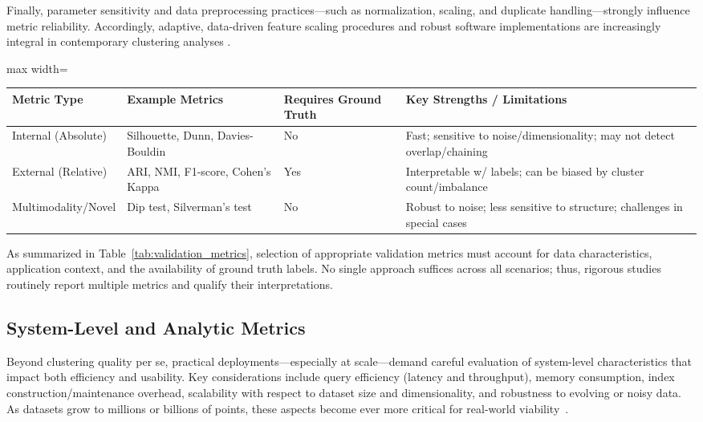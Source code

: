 \documentclass[sigconf]{acmart}
\begin{document}
Finally, parameter sensitivity and data preprocessing practices—such as normalization, scaling, and duplicate handling—strongly influence metric reliability. Accordingly, adaptive, data-driven feature scaling procedures and robust software implementations are increasingly integral in contemporary clustering analyses \cite{ref95,ref96}.

\begin{table*}[htbp]
\centering
\caption{Common Cluster Validation Metrics: Key Properties and Use Cases}
\label{tab:validation_metrics}
\begin{adjustbox}{max width=\textwidth}
\begin{tabular}{llll}
\toprule
\textbf{Metric Type} & \textbf{Example Metrics} & \textbf{Requires Ground Truth} & \textbf{Key Strengths / Limitations} \\
\midrule
Internal (Absolute)  & Silhouette, Dunn, Davies-Bouldin & No  & Fast; sensitive to noise/dimensionality; may not detect overlap/chaining \\
External (Relative)  & ARI, NMI, F1-score, Cohen's Kappa & Yes & Interpretable w/ labels; can be biased by cluster count/imbalance        \\
Multimodality/Novel  & Dip test, Silverman's test         & No  & Robust to noise; less sensitive to structure; challenges in special cases \\
\bottomrule
\end{tabular}
\end{adjustbox}
\end{table*}

As summarized in Table~\ref{tab:validation_metrics}, selection of appropriate validation metrics must account for data characteristics, application context, and the availability of ground truth labels. No single approach suffices across all scenarios; thus, rigorous studies routinely report multiple metrics and qualify their interpretations.

\subsection{System-Level and Analytic Metrics}

Beyond clustering quality per se, practical deployments—especially at scale—demand careful evaluation of system-level characteristics that impact both efficiency and usability. Key considerations include query efficiency (latency and throughput), memory consumption, index construction/maintenance overhead, scalability with respect to dataset size and dimensionality, and robustness to evolving or noisy data. As datasets grow to millions or billions of points, these aspects become ever more critical for real-world viability~\cite{ref59, ref60, ref64, ref65, ref66, ref67, ref74, ref77, ref78, ref79, ref80, ref81, ref86, ref87, ref106, ref108, ref109, ref110, ref116, ref117, ref118}.
\end{document}
